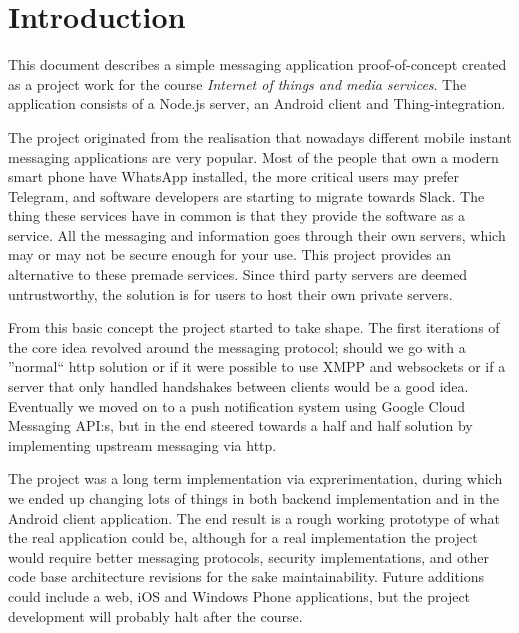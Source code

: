 
\section{Introduction}
This document describes a simple messaging application proof-of-concept created as a project work for the course \emph{Internet of things and media services}. The application consists of a Node.js server, an Android client and Thing\texttrademark-integration.

The project originated from the realisation that nowadays different mobile instant messaging applications are very popular. Most of the people that own a modern smart phone have WhatsApp installed, the more critical users may prefer Telegram, and software developers are starting to migrate towards Slack. The thing these services have in common is that they provide the software as a service. All the messaging and information goes through their own servers, which may or may not be secure enough for your use. This project provides an alternative to these premade services. Since third party servers are deemed untrustworthy, the solution is for users to host their own private servers.

From this basic concept the project started to take shape. The first iterations of the core idea revolved around the messaging protocol; should we go with a ''normal`` http solution or if it were possible to use XMPP and websockets or if a server that only handled handshakes between clients would be a good idea. Eventually we moved on to a push notification system using Google Cloud Messaging API:s, but in the end steered towards a half and half solution by implementing upstream messaging via http.

The project was a long term implementation via exprerimentation, during which we ended up changing lots of things in both backend implementation and in the Android client application. The end result is a rough working prototype of what the real application could be, although for a real implementation the project would require better messaging protocols, security implementations, and other code base architecture revisions for the sake maintainability. Future additions could include a web, iOS and Windows Phone applications, but the project development will probably halt after the course.

